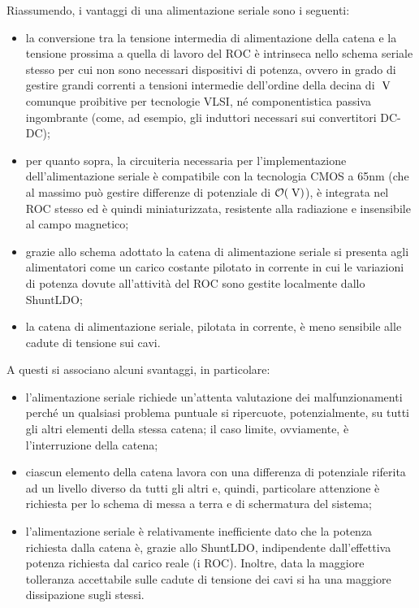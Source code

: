 Riassumendo, i vantaggi di una alimentazione seriale sono i seguenti:
\begin{itemize}
\item la conversione tra la tensione intermedia di alimentazione della catena e la tensione prossima a quella di lavoro del ROC \`e intrinseca nello schema seriale stesso per cui non sono necessari dispositivi di potenza, ovvero in grado di gestire grandi correnti a tensioni intermedie dell'ordine della decina di $\rm \; V$ comunque proibitive per tecnologie VLSI, n\'e componentistica passiva ingombrante (come, ad esempio, gli induttori necessari sui convertitori DC-DC);
\item per quanto sopra, la circuiteria necessaria per l'implementazione dell'alimentazione seriale \`e compatibile con la tecnologia CMOS a 65nm (che al massimo pu\`o gestire differenze di potenziale di ${\cal O}(\rm \; V)$), \`e integrata nel ROC stesso ed \`e quindi miniaturizzata, resistente alla radiazione e insensibile al campo magnetico; 
\item grazie allo schema adottato la catena di alimentazione seriale si presenta agli alimentatori come un carico costante pilotato in corrente in cui le variazioni di potenza dovute all'attivit\`a del ROC sono gestite localmente dallo ShuntLDO;
\item la catena di alimentazione seriale, pilotata in corrente, \`e meno sensibile alle cadute di tensione sui cavi.
\end{itemize}
A questi si associano alcuni svantaggi, in particolare:
\begin{itemize}
\item l'alimentazione seriale richiede un'attenta valutazione dei malfunzionamenti perch\'e un qualsiasi problema puntuale si ripercuote, potenzialmente, su tutti gli altri elementi della stessa catena; il caso limite, ovviamente, \`e l'interruzione della catena;
\item ciascun elemento della catena lavora con una differenza di potenziale riferita ad un livello diverso da tutti gli altri e, quindi, particolare attenzione \`e richiesta per lo schema di messa a terra e di schermatura del sistema;
\item l'alimentazione seriale \`e relativamente inefficiente dato che la potenza richiesta dalla catena \`e, grazie allo ShuntLDO, indipendente dall'effettiva potenza richiesta dal carico reale (i ROC). Inoltre, data la maggiore tolleranza accettabile sulle cadute di tensione dei cavi si ha una maggiore dissipazione sugli stessi. 
\end{itemize}

